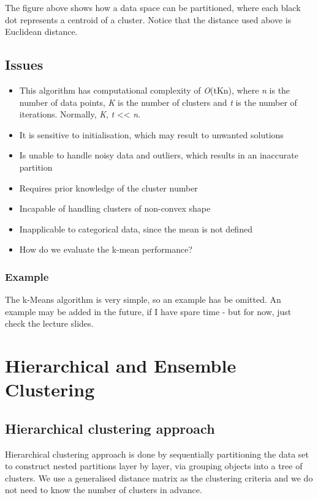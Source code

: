 \documentclass[11pt,fleqn]{book} %
\begin{document}
\noindent
The figure above shows how a data space can be partitioned, where each black dot represents a centroid of a cluster. Notice that the distance used above is Euclidean distance.

\section{Issues}

\begin{itemize}
	\item This algorithm has computational complexity of \textit{O}(tKn), where \textit{n} is the number of data points, \textit{K} is the number of clusters and \textit{t} is the number of iterations. Normally, \textit{K}, \textit{t} << \textit{n}.
	\item It is sensitive to initialisation, which may result to unwanted solutions
	\item Is unable to handle noisy data and outliers, which results in an inaccurate partition
	\item Requires prior knowledge of the cluster number
	\item Incapable of handling clusters of non-convex shape
	\item Inapplicable to categorical data, since the mean is not defined
	\item How do we evaluate the k-mean performance? 
\end{itemize}

\subsection*{Example}
The k-Means algorithm is very simple, so an example has be omitted. An example may be added in the future, if I have spare time - but for now, just check the lecture slides.



\chapter{Hierarchical and Ensemble Clustering}

\section{Hierarchical clustering approach}
Hierarchical clustering approach is done by sequentially partitioning the data set to construct nested partitions layer by layer, via grouping objects into a tree of clusters. We use a generalised distance matrix as the clustering criteria and we do not need to know the number of clusters in advance.
\end{document}
